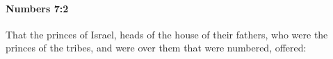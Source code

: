 
		\paragraph{Numbers 7:2} %
			\label{NUMBERS-7-2}

			That the princes of Israel, heads of the house of their fathers, who were the princes of the tribes, and were over them that were numbered, offered:


